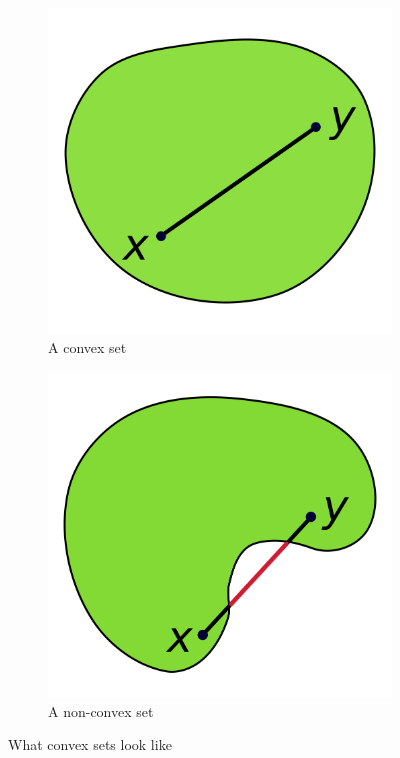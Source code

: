 \begin{figure}
  \centering
  \begin{subfigure}[b]{0.45\linewidth}
    \includegraphics[width=\linewidth]{convex-set}
    \caption{A convex set}
  \end{subfigure}
  \begin{subfigure}[b]{0.45\linewidth}
    \includegraphics[width=\linewidth]{nonconvex-set}
    \caption{A non-convex set}
  \end{subfigure}
  \caption{What convex sets look like}
  \label{fig:convexset}
\end{figure}

